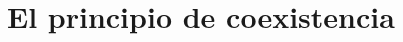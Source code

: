 \documentclass[a4paper,10pt]{book}
\theoremstyle{definition}
\newtheorem{conclution}{\en{Conclution}\es{Conclusión}}%
\newif\ifen
\newif\ifes
\newcommand{\en}[1]{\ifen#1\fi}
\newcommand{\es}[1]{\ifes#1\fi}
\newcommand{\Ee}{\en{s}\es{e}}
\begin{document}
% 

% 




\section{El principio de coexistencia}
\end{document}
